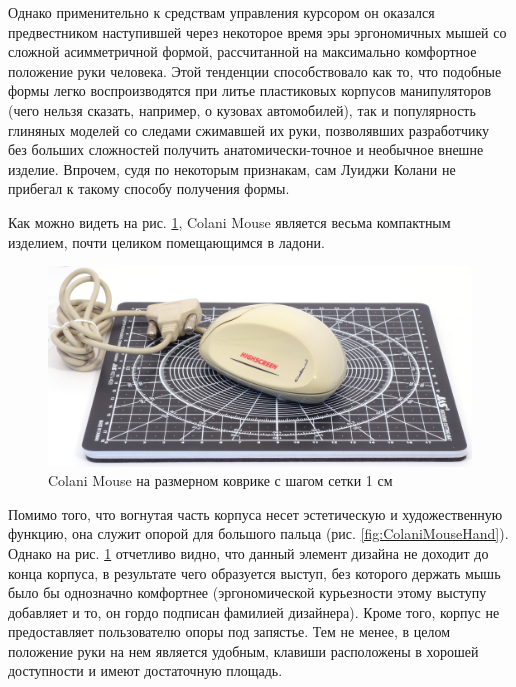 \documentclass[11pt, a4paper]{article}
\begin{document}
Однако применительно к средствам управления курсором он оказался предвестником наступившей через некоторое время эры эргономичных мышей со сложной асимметричной формой, рассчитанной на максимально комфортное положение руки человека. Этой тенденции способствовало как то, что подобные формы легко воспроизводятся при литье пластиковых корпусов манипуляторов (чего нельзя сказать, например, о кузовах автомобилей), так и популярность глиняных моделей со следами сжимавшей их руки, позволявших разработчику без больших сложностей получить анатомически-точное и необычное внешне изделие. Впрочем, судя по некоторым признакам, сам Луиджи Колани не прибегал к такому способу получения формы.

Как можно видеть на рис. \ref{fig:ColaniMouseSize}, Colani Mouse является весьма компактным изделием, почти целиком помещающимся в ладони.

\begin{figure}[h]
    \centering
    \includegraphics[scale=0.5]{1993_colani_mouse/size_30.jpg}
    \caption{Colani Mouse на размерном коврике с шагом сетки 1 см}
    \label{fig:ColaniMouseSize}
\end{figure}

Помимо того, что вогнутая часть корпуса несет эстетическую и художественную функцию, она служит опорой для большого пальца (рис. \ref{fig:ColaniMouseHand}). Однако на рис. \ref{fig:ColaniMouseSize} отчетливо видно, что данный элемент дизайна не доходит до конца корпуса, в результате чего образуется выступ, без которого держать мышь было бы однозначно комфортнее (эргономической курьезности этому выступу добавляет и то, он гордо подписан фамилией дизайнера). Кроме того, корпус не предоставляет пользователю опоры под запястье. Тем не менее, в целом положение руки на нем является удобным, клавиши расположены в хорошей доступности и имеют достаточную площадь.
\end{document}
